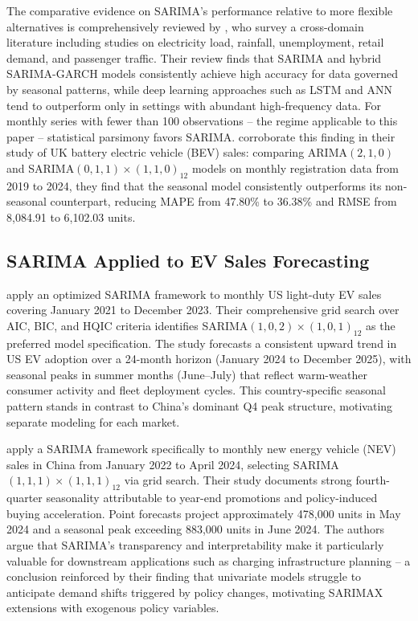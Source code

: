 \documentclass[12pt]{article}
\begin{document}
The comparative evidence on SARIMA's performance relative to more flexible alternatives is comprehensively reviewed by \citet{cetin2024}, who survey a cross-domain literature including studies on electricity load, rainfall, unemployment, retail demand, and passenger traffic. Their review finds that SARIMA and hybrid SARIMA-GARCH models consistently achieve high accuracy for data governed by seasonal patterns, while deep learning approaches such as LSTM and ANN tend to outperform only in settings with abundant high-frequency data. For monthly series with fewer than 100 observations -- the regime applicable to this paper -- statistical parsimony favors SARIMA. \citet{lu2024} corroborate this finding in their study of UK battery electric vehicle (BEV) sales: comparing ARIMA$(2,1,0)$ and SARIMA$(0,1,1)\times(1,1,0)_{12}$ models on monthly registration data from 2019 to 2024, they find that the seasonal model consistently outperforms its non-seasonal counterpart, reducing MAPE from 47.80\% to 36.38\% and RMSE from 8,084.91 to 6,102.03 units.

\subsection{SARIMA Applied to EV Sales Forecasting}

\citet{cetin2024} apply an optimized SARIMA framework to monthly US light-duty EV sales covering January 2021 to December 2023. Their comprehensive grid search over AIC, BIC, and HQIC criteria identifies SARIMA$(1,0,2)\times(1,0,1)_{12}$ as the preferred model specification. The study forecasts a consistent upward trend in US EV adoption over a 24-month horizon (January 2024 to December 2025), with seasonal peaks in summer months (June--July) that reflect warm-weather consumer activity and fleet deployment cycles. This country-specific seasonal pattern stands in contrast to China's dominant Q4 peak structure, motivating separate modeling for each market.

\citet{chen2025} apply a SARIMA framework specifically to monthly new energy vehicle (NEV) sales in China from January 2022 to April 2024, selecting SARIMA$(1,1,1)\times(1,1,1)_{12}$ via grid search. Their study documents strong fourth-quarter seasonality attributable to year-end promotions and policy-induced buying acceleration. Point forecasts project approximately 478,000 units in May 2024 and a seasonal peak exceeding 883,000 units in June 2024. The authors argue that SARIMA's transparency and interpretability make it particularly valuable for downstream applications such as charging infrastructure planning -- a conclusion reinforced by their finding that univariate models struggle to anticipate demand shifts triggered by policy changes, motivating SARIMAX extensions with exogenous policy variables.
\end{document}
